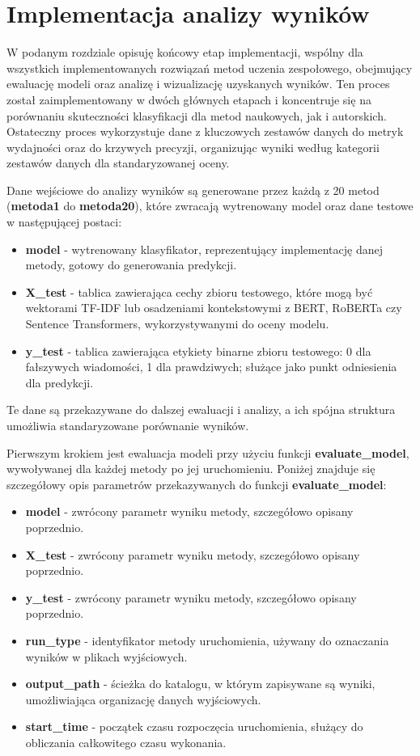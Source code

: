 \section{Implementacja analizy wyników}

W podanym rozdziale opisuję końcowy etap implementacji, wspólny dla wszystkich implementowanych rozwiązań metod uczenia zespołowego, obejmujący ewaluację modeli oraz analizę i wizualizację uzyskanych wyników. Ten proces został zaimplementowany w dwóch głównych etapach i koncentruje się na porównaniu skuteczności klasyfikacji dla metod naukowych, jak i autorskich. Ostateczny proces wykorzystuje dane z kluczowych zestawów danych do metryk wydajności oraz do krzywych precyzji, organizując wyniki według kategorii zestawów danych dla standaryzowanej oceny.

Dane wejściowe do analizy wyników są generowane przez każdą z 20 metod (\textbf{metoda1} do \textbf{metoda20}), które zwracają wytrenowany model oraz dane testowe w następującej postaci:
\begin{itemize}
	\item \textbf{model} - wytrenowany klasyfikator, reprezentujący implementację danej metody, gotowy do generowania predykcji.
	\item \textbf{X\_test} - tablica zawierająca cechy zbioru testowego, które mogą być wektorami TF-IDF lub osadzeniami kontekstowymi z BERT, RoBERTa czy Sentence Transformers, wykorzystywanymi do oceny modelu.
	\item \textbf{y\_test} - tablica zawierająca etykiety binarne zbioru testowego: 0 dla fałszywych wiadomości, 1 dla prawdziwych; służące jako punkt odniesienia dla predykcji.
\end{itemize}
Te dane są przekazywane do dalszej ewaluacji i analizy, a ich spójna struktura umożliwia standaryzowane porównanie wyników.

Pierwszym krokiem jest ewaluacja modeli przy użyciu funkcji \textbf{evaluate\_model}, wywoływanej dla każdej metody po jej uruchomieniu. Poniżej znajduje się szczegółowy opis parametrów przekazywanych do funkcji \textbf{evaluate\_model}:
\begin{itemize}
	\item \textbf{model} - zwrócony parametr wyniku metody, szczegółowo opisany poprzednio.
	\item \textbf{X\_test} - zwrócony parametr wyniku metody, szczegółowo opisany poprzednio.
	\item \textbf{y\_test} - zwrócony parametr wyniku metody, szczegółowo opisany poprzednio.
	\item \textbf{run\_type} - identyfikator metody uruchomienia, używany do oznaczania wyników w plikach wyjściowych.
	\item \textbf{output\_path} - ścieżka do katalogu, w którym zapisywane są wyniki, umożliwiająca organizację danych wyjściowych.
	\item \textbf{start\_time} - początek czasu rozpoczęcia uruchomienia, służący do obliczania całkowitego czasu wykonania.
\end{itemize}

